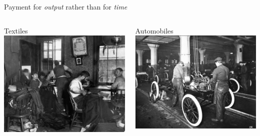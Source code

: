 \documentclass[presentation]{subfiles}
\begin{document}
\begin{frame}[t]{Payment for \emph{output} rather than for \emph{time}}
  \begin{columns}[T]
    \begin{column}{0.33\textwidth}
      \centering
      Textiles\\
      \includegraphics[max width=\linewidth,max height=.3\textheight,keepaspectratio]{figures/pieceworkers.jpg}
    \end{column}
    \begin{column}{0.33\textwidth}
      \centering
      Automobiles\\
      \includegraphics[max width=\linewidth,max height=.3\textheight,keepaspectratio]{figures/photo/ford_assembly_line.jpg}

\end{column}
\end{columns}
\end{frame}
\end{document}
